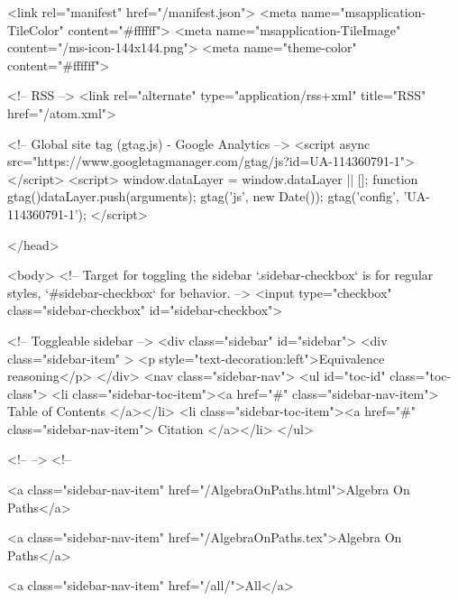   <link rel="manifest" href="/manifest.json">
  <meta name="msapplication-TileColor" content="#ffffff">
  <meta name="msapplication-TileImage" content="/ms-icon-144x144.png">
  <meta name="theme-color" content="#ffffff">
  
  <!-- RSS -->
  <link rel="alternate" type="application/rss+xml" title="RSS" href="/atom.xml">

  <!-- Global site tag (gtag.js) - Google Analytics -->
  <script async src="https://www.googletagmanager.com/gtag/js?id=UA-114360791-1"></script>
  <script>
    window.dataLayer = window.dataLayer || [];
    function gtag(){dataLayer.push(arguments);}
    gtag('js', new Date());
    gtag('config', 'UA-114360791-1');
  </script>

  
</head>




  <body>
    <!-- Target for toggling the sidebar `.sidebar-checkbox` is for regular
     styles, `#sidebar-checkbox` for behavior. -->
<input type="checkbox" class="sidebar-checkbox" id="sidebar-checkbox">

<!-- Toggleable sidebar -->
<div class="sidebar" id="sidebar">
  <div class="sidebar-item" >
    <p style="text-decoration:left">Equivalence reasoning</p>
  </div>
  <nav class="sidebar-nav">
    <ul id="toc-id" class="toc-class">
  <li class="sidebar-toc-item"><a href="#" class="sidebar-nav-item"> Table of Contents </a></li>
  <li class="sidebar-toc-item"><a href="#" class="sidebar-nav-item"> Citation </a></li>
</ul>


    <!--  -->
    <!-- 
      
    
      
    
      
    
      
        
      
    
      
        
          <a class="sidebar-nav-item" href="/AlgebraOnPaths.html">Algebra On Paths</a>
        
      
    
      
        
          <a class="sidebar-nav-item" href="/AlgebraOnPaths.tex">Algebra On Paths</a>
        
      
    
      
        
          <a class="sidebar-nav-item" href="/all/">All</a>
        
      
    
      
        
